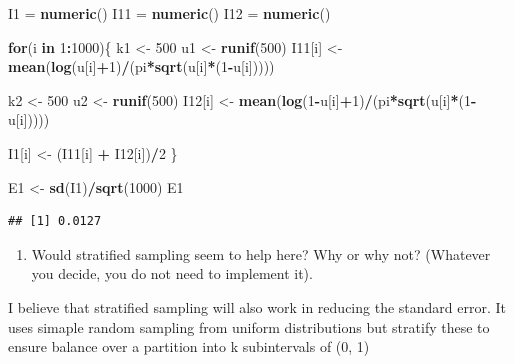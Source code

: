 \documentclass[
]{article}
\newenvironment{Shaded}{\begin{snugshade}}{\end{snugshade}}
\newcommand{\ControlFlowTok}[1]{\textcolor[rgb]{0.13,0.29,0.53}{\textbf{#1}}}
\newcommand{\DecValTok}[1]{\textcolor[rgb]{0.00,0.00,0.81}{#1}}
\newcommand{\KeywordTok}[1]{\textcolor[rgb]{0.13,0.29,0.53}{\textbf{#1}}}
\newcommand{\NormalTok}[1]{#1}
\newcommand{\OperatorTok}[1]{\textcolor[rgb]{0.81,0.36,0.00}{\textbf{#1}}}
\newcommand{\StringTok}[1]{\textcolor[rgb]{0.31,0.60,0.02}{#1}}
\providecommand{\tightlist}{%
  \setlength{\itemsep}{0pt}\setlength{\parskip}{0pt}}
\begin{document}
\begin{Shaded}
\begin{Highlighting}[]
\NormalTok{I1 =}\StringTok{ }\KeywordTok{numeric}\NormalTok{()}
\NormalTok{I11 =}\StringTok{ }\KeywordTok{numeric}\NormalTok{()}
\NormalTok{I12 =}\StringTok{ }\KeywordTok{numeric}\NormalTok{()}


\ControlFlowTok{for}\NormalTok{(i }\ControlFlowTok{in} \DecValTok{1}\OperatorTok{:}\DecValTok{1000}\NormalTok{)\{}
\NormalTok{  k1 <-}\StringTok{ }\DecValTok{500}
\NormalTok{  u1 <-}\StringTok{ }\KeywordTok{runif}\NormalTok{(}\DecValTok{500}\NormalTok{)}
\NormalTok{  I11[i] <-}\StringTok{  }\KeywordTok{mean}\NormalTok{(}\KeywordTok{log}\NormalTok{(u[i]}\OperatorTok{+}\DecValTok{1}\NormalTok{)}\OperatorTok{/}\NormalTok{(pi}\OperatorTok{*}\KeywordTok{sqrt}\NormalTok{(u[i]}\OperatorTok{*}\NormalTok{(}\DecValTok{1}\OperatorTok{-}\NormalTok{u[i]))))}
  
\NormalTok{  k2 <-}\StringTok{ }\DecValTok{500}
\NormalTok{  u2 <-}\StringTok{ }\KeywordTok{runif}\NormalTok{(}\DecValTok{500}\NormalTok{)}
\NormalTok{  I12[i] <-}\StringTok{  }\KeywordTok{mean}\NormalTok{(}\KeywordTok{log}\NormalTok{(}\DecValTok{1}\OperatorTok{-}\NormalTok{u[i]}\OperatorTok{+}\DecValTok{1}\NormalTok{)}\OperatorTok{/}\NormalTok{(pi}\OperatorTok{*}\KeywordTok{sqrt}\NormalTok{(u[i]}\OperatorTok{*}\NormalTok{(}\DecValTok{1}\OperatorTok{-}\NormalTok{u[i]))))}
  
  
\NormalTok{  I1[i] <-}\StringTok{ }\NormalTok{(I11[i] }\OperatorTok{+}\StringTok{ }\NormalTok{I12[i])}\OperatorTok{/}\DecValTok{2}
\NormalTok{\}}

\NormalTok{E1 <-}\StringTok{ }\KeywordTok{sd}\NormalTok{(I1)}\OperatorTok{/}\KeywordTok{sqrt}\NormalTok{(}\DecValTok{1000}\NormalTok{)}
\NormalTok{E1}
\end{Highlighting}
\end{Shaded}

\begin{verbatim}
## [1] 0.0127
\end{verbatim}

\begin{enumerate}
\def\labelenumi{\alph{enumi}.}
\setcounter{enumi}{2}
\tightlist
\item
  Would stratified sampling seem to help here? Why or why not? (Whatever
  you decide, you do not need to implement it).
\end{enumerate}

I believe that stratified sampling will also work in reducing the
standard error. It uses simaple random sampling from uniform
distributions but stratify these to ensure balance over a partition into
k subintervals of (0, 1)
\end{document}
